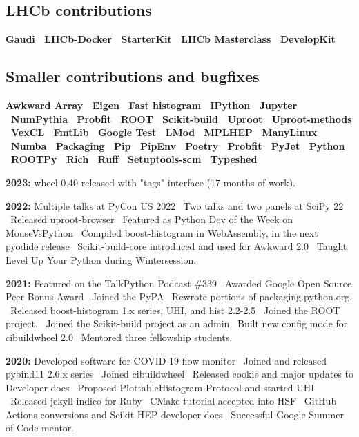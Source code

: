 \documentclass[10pt,letterpaper]{moderncv}
\begin{document}
\subsection{LHCb contributions}
\textbf{%
	Gaudi \textbullet\
	LHCb-Docker \textbullet\
	StarterKit \textbullet\
	LHCb Masterclass \textbullet\
	DevelopKit
}

\subsection{Smaller contributions and bugfixes}
\textbf{%
	Awkward Array \textbullet\
	Eigen  \textbullet\
	Fast histogram \textbullet\
	IPython \textbullet\
	Jupyter \textbullet\
	NumPythia \textbullet\
	Probfit  \textbullet\
	ROOT \textbullet\
	Scikit-build \textbullet\
	Uproot  \textbullet\
	Uproot-methods \textbullet\
	VexCL \textbullet\
    FmtLib \textbullet\
    Google Test  \textbullet\
    LMod \textbullet\
    MPLHEP \textbullet\
    ManyLinux \textbullet\
    Numba \textbullet\
    Packaging \textbullet\
    Pip \textbullet\
    PipEnv \textbullet\
    Poetry \textbullet\
    Probfit \textbullet\
    PyJet \textbullet\
    Python \textbullet\
    ROOTPy \textbullet\
    Rich \textbullet\
    Ruff \textbullet\
    Setuptools-scm \textbullet\
    Typeshed
}



\textbf{2023:}
wheel 0.40 released with "tags" interface (17 months of work).

\textbf{2022:}
Multiple talks at PyCon US 2022 \textbullet\
Two talks and two panels at SciPy 22 \textbullet\
Released uproot-browser \textbullet\
Featured as Python Dev of the Week on MouseVsPython \textbullet\
Compiled boost-histogram in WebAssembly, in the next pyodide release \textbullet\
Scikit-build-core introduced and used for Awkward 2.0 \textbullet\
Taught Level Up Your Python during Wintersession.

\textbf{2021:}
Featured on the TalkPython Podcast \#339 \textbullet\
Awarded Google Open Source Peer Bonus Award \textbullet\
Joined the PyPA \textbullet\ Rewrote portions of packaging.python.org. \textbullet\
Released boost-histogram 1.x series, UHI, and hist 2.2-2.5 \textbullet\
Joined the ROOT project. \textbullet\
Joined the Scikit-build project as an admin \textbullet\
Built new config mode for cibuildwheel 2.0 \textbullet\
Mentored three fellowship students.

\textbf{2020:}
Developed software for COVID-19 flow monitor \textbullet\
Joined and released pybind11 2.6.x series \textbullet\
Joined cibuildwheel \textbullet\
Released cookie and major updates to Developer docs \textbullet\
Proposed PlottableHistogram Protocol and started UHI \textbullet\
Released jekyll-indico for Ruby \textbullet\
CMake tutorial accepted into HSF \textbullet\
GitHub Actions conversions and Scikit-HEP developer docs \textbullet\
Successful Google Summer of Code mentor.
\end{document}
